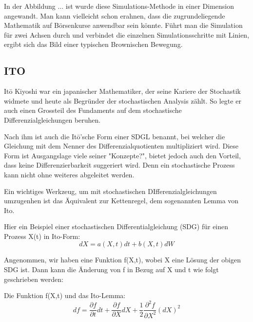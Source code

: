 In der Abbildung ... ist wurde diese Simulations-Methode in einer Dimension angewandt. Man kann vielleicht schon erahnen, dass die zugrundeliegende Mathematik auf Börsenkurse anwendbar sein könnte. Führt man die Simulation für zwei Achsen durch und verbindet die einzelnen Simulationsschritte mit Linien, ergibt sich das Bild einer typischen Brownischen Bewegung.


\subsection{ITO
\label{brown:ito}}
Itō Kiyoshi war ein japanischer Mathematiker, der seine Kariere der Stochastik widmete und heute als Begründer der stochastischen Analysis zählt. So legte er auch einen Grossteil des Fundaments auf dem stochastische Differenzialgleichungen beruhen. 

Nach ihm ist auch die Itō'sche Form einer SDGL benannt, bei welcher die Gleichung mit dem Nenner des Differenzialquotienten multipliziert wird. Diese Form ist Ausgangslage viele seiner "Konzepte?", bietet jedoch auch den Vorteil, dass keine Differenzierbarkeit suggeriert wird. Denn ein stochastische Prozess kann nicht ohne weiteres abgeleitet werden.

Ein wichtiges Werkzeug, um mit stochastischen DIfferenzialgleichungen umzugenhen ist das Äquivalent zur Kettenregel, dem sogenannten Lemma von Ito. %

Hier ein Beispiel einer stochastischen Differentialgleichung (SDG) für einen Prozess X(t) in Ito-Form:
\begin{equation}
	dX = a(X,t) dt + b(X,t) dW
\end{equation}

Angenommen, wir haben eine Funktion f(X,t), wobei X eine Lösung der obigen SDG ist. Dann kann die Änderung von f in Bezug auf X und t wie folgt geschrieben werden:

Die Funktion f(X,t) und das Ito-Lemma:
\begin{equation}
	df = \frac{\partial f}{\partial t} dt + \frac{\partial f}{\partial X} dX + \frac{1}{2} \frac{\partial^2 f}{\partial X^2} (dX)^2	
\end{equation}


